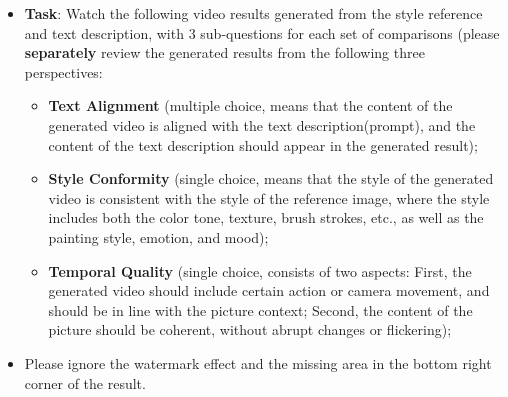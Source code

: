 \begin{itemize}[leftmargin=2.0em]
    \item \textbf{Task}: Watch the following video results generated from the style reference and text description, with 3 sub-questions for each set of comparisons (please \textbf{separately} review the generated results from the following three perspectives:

    \begin{itemize}[leftmargin=2.0em]
        \item \textbf{Text Alignment} (multiple choice, means that the content of the generated video is aligned with the text description(prompt), and the content of the text description should appear in the generated result);
        \item \textbf{Style Conformity} (single choice, means that the style of the generated video is consistent with the style of the reference image, where the style includes both the color tone, texture, brush strokes, etc., as well as the painting style, emotion, and mood);
        \item \textbf{Temporal Quality} (single choice, consists of two aspects: First, the generated video should include certain action or camera movement, and should be in line with the picture context; Second, the content of the picture should be coherent, without abrupt changes or flickering);
    \end{itemize}
    
    \item Please ignore the watermark effect and the missing area in the bottom right corner of the result.
\end{itemize}

